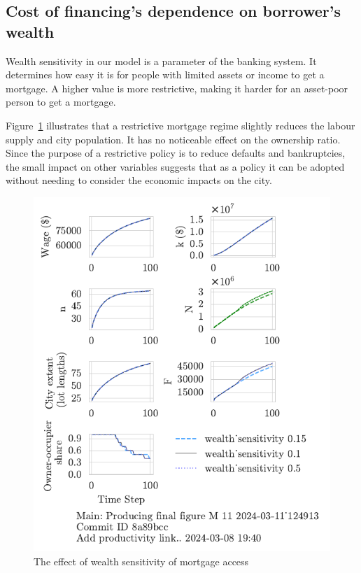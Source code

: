\newpage
\subsection{Cost of financing's dependence on borrower's wealth}
Wealth sensitivity in our model is a parameter of the banking system. It determines how easy it is for people with limited assets or income to get a mortgage. A higher value is more restrictive,  making it harder for an asset-poor person to get a mortgage.

Figure~\ref{fig:wealth_sensitivity_ownership_trajectory} illustrates that a restrictive mortgage regime slightly reduces the labour supply and city population. It has no noticeable effect on the ownership ratio. Since the purpose of a restrictive policy is to reduce defaults and bankruptcies, the small impact on other variables suggests that as a policy it can be adopted without needing to consider the economic impacts on the city. 

\begin{figure}[h!bt]
    \centering
    \includegraphics[scale=1, trim={0 1.4cm 0 0},clip]{fig/wealth_sensitivity-124913.pdf}
    \caption{The effect of wealth sensitivity of mortgage access}
    \label{fig:wealth_sensitivity_ownership_trajectory}
\end{figure}

